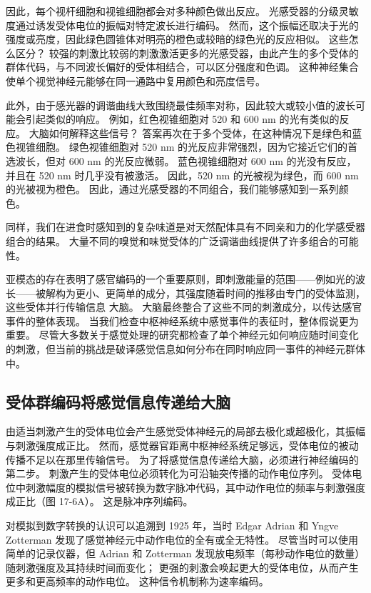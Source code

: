 因此，每个视杆细胞和视锥细胞都会对多种颜色做出反应。 光感受器的分级灵敏度通过诱发受体电位的振幅对特定波长进行编码。 然而，这个振幅还取决于光的强度或亮度，因此绿色圆锥体对明亮的橙色或较暗的绿色光的反应相似。 这些怎么区分？ 较强的刺激比较弱的刺激激活更多的光感受器，由此产生的多个受体的群体代码，与不同波长偏好的受体相结合，可以区分强度和色调。 这种神经集合使单个视觉神经元能够在同一通路中复用颜色和亮度信号。

此外，由于感光器的调谐曲线大致围绕最佳频率对称，因此较大或较小值的波长可能会引起类似的响应。 例如，红色视锥细胞对 520 和 600 nm 的光有类似的反应。 大脑如何解释这些信号？ 答案再次在于多个受体，在这种情况下是绿色和蓝色视锥细胞。 绿色视锥细胞对 520 nm 的光反应非常强烈，因为它接近它们的首选波长，但对 600 nm 的光反应微弱。 蓝色视锥细胞对 600 nm 的光没有反应，并且在 520 nm 时几乎没有被激活。 因此，520 nm 的光被视为绿色，而 600 nm 的光被视为橙色。 因此，通过光感受器的不同组合，我们能够感知到一系列颜色。

同样，我们在进食时感知到的复杂味道是对天然配体具有不同亲和力的化学感受器组合的结果。 大量不同的嗅觉和味觉受体的广泛调谐曲线提供了许多组合的可能性。

亚模态的存在表明了感官编码的一个重要原则，即刺激能量的范围——例如光的波长——被解构为更小、更简单的成分，其强度随着时间的推移由专门的受体监测，这些受体并行传输信息 大脑。 大脑最终整合了这些不同的刺激成分，以传达感官事件的整体表现。 当我们检查中枢神经系统中感觉事件的表征时，整体假说更为重要。 尽管大多数关于感觉处理的研究都检查了单个神经元如何响应随时间变化的刺激，但当前的挑战是破译感觉信息如何分布在同时响应同一事件的神经元群体中。


\subsection{受体群编码将感觉信息传递给大脑}

由适当刺激产生的受体电位会产生感觉受体神经元的局部去极化或超极化，其振幅与刺激强度成正比。 然而，感觉器官距离中枢神经系统足够远，受体电位的被动传播不足以在那里传输信号。 为了将感觉信息传递给大脑，必须进行神经编码的第二步。 刺激产生的受体电位必须转化为可沿轴突传播的动作电位序列。 受体电位中刺激幅度的模拟信号被转换为数字脉冲代码，其中动作电位的频率与刺激强度成正比（图 17-6A）。 这是脉冲序列编码。

对模拟到数字转换的认识可以追溯到 1925 年，当时 Edgar Adrian 和 Yngve Zotterman 发现了感觉神经元中动作电位的全有或全无特性。 尽管当时可以使用简单的记录仪器，但 Adrian 和 Zotterman 发现放电频率（每秒动作电位的数量）随刺激强度及其持续时间而变化； 更强的刺激会唤起更大的受体电位，从而产生更多和更高频率的动作电位。 这种信令机制称为速率编码。

